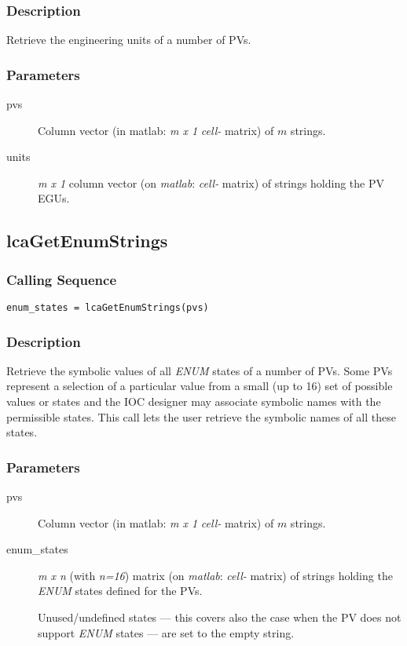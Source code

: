 \documentclass{article}
\newcommand{\matlab}{\ita{matlab}}
\newcommand{\pbrk}{\pagebreak[3]}
\newcommand{\MAXENUM}{16}
\newcommand{\ita}[1]{\emph{#1}}
\newcommand{\m}{$m$}
\newcommand{\mhack}{$m$} %
\newcommand{\n}{$n$}
\newcommand{\mxn}{$m\times n$}
\newcommand{\mxl}{$m\times 1$}
\newcommand{\inmath}[1]{$#1$}
\renewcommand{\m}{\ita{m}}
\newcommand{\mhack}{\ita{m}} %
\renewcommand{\n}{\ita{n}}
\renewcommand{\mxn}{\ita{m x n}}
\renewcommand{\mxl}{\ita{m x 1}}
\renewcommand{\pbrk}{}
\renewcommand{\inmath}[1]{\ita{#1}}
\newcommand{\PVITEM}{
\item[pvs] Column vector (in matlab: \mxl{} \ita{cell-} matrix)
of \mhack{} strings.
}
\begin{document}
\subsubsection{Description}
Retrieve the engineering units of a number of PVs.
\subsubsection{Parameters}
\begin{description}
\PVITEM
\item[units] \mxl{} column vector (on \matlab: \ita{cell-} matrix)
of strings holding the PV EGUs.
\end{description}

\vspace*{\fill}
\pbrk
\subsection{lcaGetEnumStrings}
\subsubsection{Calling Sequence}
\begin{verbatim}
enum_states = lcaGetEnumStrings(pvs)
\end{verbatim}
\subsubsection{Description}
Retrieve the symbolic values of all \ita{ENUM} states of a number of PVs.
Some PVs represent a selection of a particular value from a small (up to \MAXENUM)
set of possible values or states and the IOC designer may associate symbolic names
with the permissible states. This call lets the user retrieve the symbolic names
of all these states.

\subsubsection{Parameters}
\begin{description}
\PVITEM
\item[enum\_states] \mxn{} (with \n \inmath{=\MAXENUM}) matrix (on \matlab: \ita{cell-} matrix)
of strings holding the \ita{ENUM} states defined for the PVs.

Unused/undefined states --- this covers also the
case when the PV does not support \ita{ENUM} states --- are set to the empty string.
\end{description}
\end{document}
